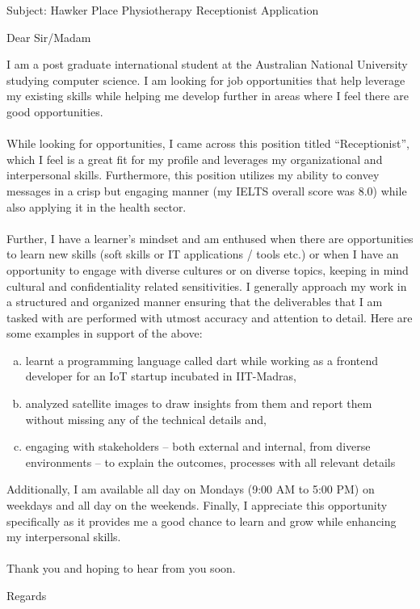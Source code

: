 \documentclass{letter}
\begin{document}
\begin{letter}{Subject: Hawker Place Physiotherapy Receptionist Application }
\opening{Dear Sir/Madam}
I am a post graduate international student at the Australian National University studying computer science. I am looking for job opportunities that help leverage my existing skills while helping me develop further in areas where I feel there are good opportunities.\\ \\
While looking for opportunities, I came across this position titled “Receptionist”, which I feel is a great fit for my profile and leverages my organizational and interpersonal skills. Furthermore, this position utilizes my ability to convey messages in a crisp but engaging manner (my IELTS overall score was 8.0) while also applying it in the health sector. \\ \\
Further, I have a learner’s mindset and am enthused when there are opportunities to learn new skills (soft skills or IT applications / tools etc.)  or when I have an opportunity to engage with diverse cultures or on diverse topics, keeping in mind cultural and confidentiality related sensitivities. I generally approach my work in a structured and organized manner ensuring that the deliverables that I am tasked with are performed with utmost accuracy and attention to detail. Here are some examples in support of the above:
\begin{enumerate}[(a)]
	\item learnt a programming language called dart while working as a frontend developer for an IoT startup incubated in IIT-Madras, 
	\item analyzed satellite images to draw insights from them and report them without missing any of the technical details and,
	\item engaging with stakeholders – both external and internal, from diverse environments – to explain the outcomes, processes with all relevant details 
\end{enumerate}
 Additionally, I am available all day on Mondays (9:00 AM to 5:00 PM) on weekdays and all day on the weekends. Finally, I appreciate this opportunity specifically as it provides me a good chance to learn and grow while enhancing my interpersonal skills. \\ \\
Thank you and hoping to hear from you soon.
\closing{Regards}
\end{letter}
\end{document}
